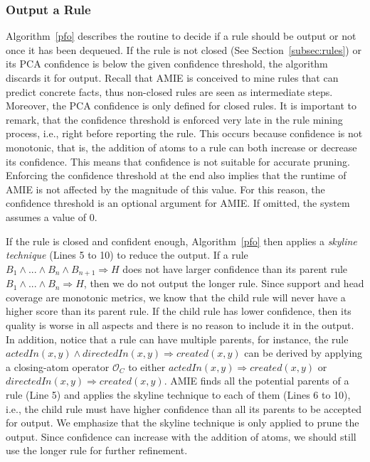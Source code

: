 \subsubsection{Output a Rule}  
\label{subsubsec:whenToOutput}
Algorithm~\ref{pfo} describes the routine to decide if a rule should be output or 
not once it has been dequeued. If the rule is not closed (See Section~\ref{subsec:rules}) or 
its PCA confidence is below the given confidence threshold, the algorithm discards it for output. 
Recall that AMIE is conceived to mine rules that can predict concrete facts, thus non-closed rules are
seen as intermediate steps. Moreover, the PCA confidence is only defined for closed rules.
It is important to remark, that the confidence threshold is enforced 
very late in the rule mining process, i.e., right before reporting the rule. 
This occurs because confidence is not monotonic, that is, the addition of atoms to a rule
can both increase or decrease its confidence. This means that confidence is not suitable for accurate
pruning. Enforcing the confidence threshold at the end also implies that
the runtime of AMIE is not affected by the magnitude of this value. For this reason, 
the confidence threshold is an optional argument for AMIE. If omitted, the system assumes a value of 0. 

If the rule is closed and confident enough, Algorithm~\ref{pfo} then applies a \emph{skyline technique} (Lines 5 to 10)
to reduce the output. If a rule $B_1 \wedge ... \wedge B_n \wedge B_{n+1} \Rightarrow H$ does not have larger confidence
than its parent rule $B_1 \wedge ... \wedge B_n \Rightarrow H$, then we do not output the longer rule.
Since support and head coverage are monotonic metrics, we know that the child rule will never have a higher score than its parent rule. 
If the child rule has lower confidence, then its quality is worse in all aspects and there is 
no reason to include it in the output.
In addition, notice that a rule can have multiple parents, for instance, the rule $actedIn(x,y) \wedge directedIn(x,y) \Rightarrow created(x,y)$
can be derived by applying a closing-atom operator $\mathcal{O}_C$ to either $actedIn(x,y) \Rightarrow created(x,y)$ or
$directedIn(x,y) \Rightarrow created(x,y)$. AMIE
finds all the potential parents of a rule (Line 5) and applies the skyline technique to each of them (Lines 6 to 10), i.e., the child
rule must have higher confidence than all its parents to be accepted for output.
We emphasize that the skyline technique is only applied to prune the output. 
Since confidence can increase with the addition of atoms, we should still use the longer rule 
for further refinement.

